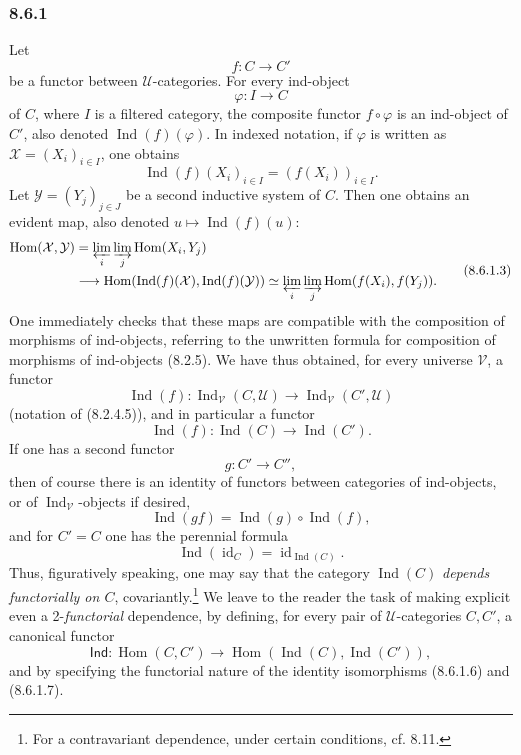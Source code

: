 \documentclass[11pt]{article}
\newcommand{\U}{\mathcal{U}}
\newcommand{\V}{\mathcal{V}}
\newcommand{\Hom}{\operatorname{Hom}}
\newcommand{\Ind}{\operatorname{Ind}}
\newcommand{\id}{\operatorname{id}}
\newcommand{\Hhom}{\operatorname{Hom}}
\begin{document}
\subsubsection*{8.6.1}
Let
\[
f:C\longrightarrow C'
\tag{8.6.1.1}
\]
be a functor between $\U$-categories. For every ind-object
\[
\varphi:I\longrightarrow C
\]
of $C$, where $I$ is a filtered category, the composite functor $f\circ\varphi$ is an ind-object of $C'$, also denoted $\Ind(f)(\varphi)$. In indexed notation, if $\varphi$ is written as $\mathcal X=(X_i)_{i\in I}$, one obtains
\[
\Ind(f)(X_i)_{i\in I}=(f(X_i))_{i\in I}.
\tag{8.6.1.2}
\]
Let $\mathcal Y=(Y_j)_{j\in J}$ be a second inductive system of $C$. Then one obtains an evident map, also denoted $u\mapsto\Ind(f)(u)$:
\[
\begin{aligned}
\Hom(\mathcal X,\mathcal Y)&=\varprojlim_i\varinjlim_j\Hom(X_i,Y_j)\\
&\longrightarrow
\Hom(\Ind(f)(\mathcal X),\Ind(f)(\mathcal Y))
\simeq\varprojlim_i\varinjlim_j\Hom(f(X_i),f(Y_j)).
\end{aligned}
\tag{8.6.1.3}
\]
One immediately checks that these maps are compatible with the composition of morphisms of ind-objects, referring to the unwritten formula for composition of morphisms of ind-objects (8.2.5). We have thus obtained, for every universe $\V$, a functor
\[
\Ind(f):\Ind_{\V}(C,\U)\longrightarrow\Ind_{\V}(C',\U)
\tag{8.6.1.4}
\]
(notation of (8.2.4.5)), and in particular a functor
\[
\Ind(f):\Ind(C)\longrightarrow\Ind(C').
\tag{8.6.1.5}
\]
If one has a second functor
\[
g:C'\longrightarrow C'',
\]
then of course there is an identity of functors between categories of ind-objects, or of $\Ind_{\V}$-objects if desired,
\[
\Ind(gf)=\Ind(g)\circ\Ind(f),
\tag{8.6.1.6}
\]
and for $C'=C$ one has the perennial formula
\[
\Ind(\id_C)=\id_{\Ind(C)}.
\tag{8.6.1.7}
\]
Thus, figuratively speaking, one may say that the category $\Ind(C)$ \emph{depends functorially on $C$}, covariantly.\footnote{For a contravariant dependence, under certain conditions, cf. 8.11.} We leave to the reader the task of making explicit even a 2-\emph{functorial} dependence, by defining, for every pair of $\U$-categories $C,C'$, a canonical functor
\[
\mathsf{Ind}:\Hhom(C,C')\longrightarrow\Hhom(\Ind(C),\Ind(C')),
\tag{8.6.1.8}
\]
and by specifying the functorial nature of the identity isomorphisms (8.6.1.6) and (8.6.1.7).
\end{document}
